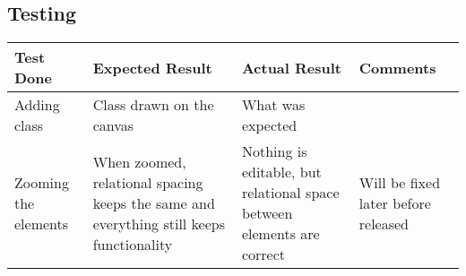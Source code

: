 
 \begin{landscape}
\section{Testing}
\begin{tabular}{| p{3cm} | p{7cm} | p{7cm} | p{6cm} | }
	\hline
	Test Done & Expected Result & Actual Result & Comments \\ \hline
	Adding class & Class drawn on the canvas & What was expected & \\ \hline
	Zooming the elements & When zoomed, relational spacing keeps the same and everything still keeps functionality & Nothing is editable, but relational space between elements are correct & Will be fixed later before released \\ \hline
\end{tabular}

 \end{landscape}
\newpage
